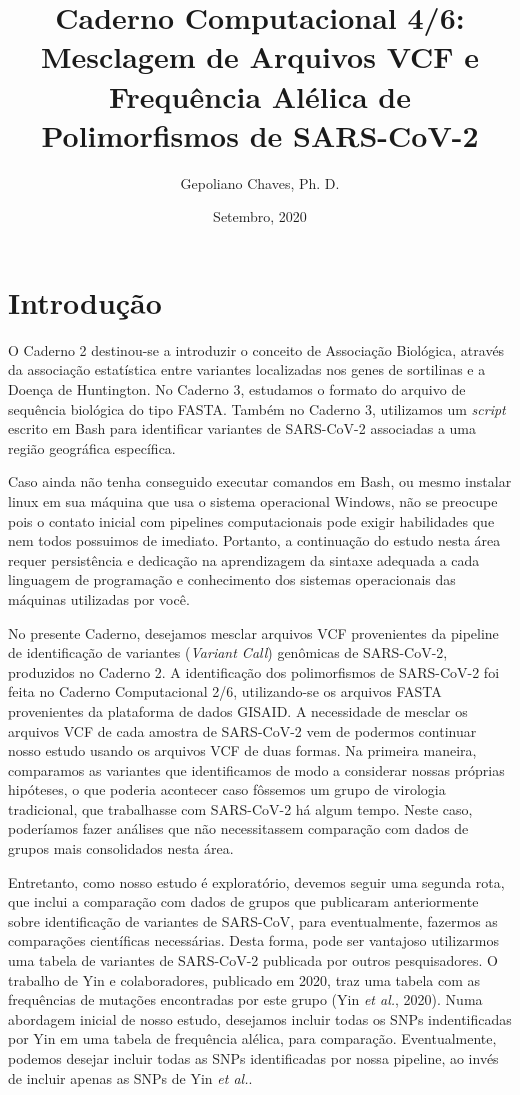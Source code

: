 \documentclass[
]{article}
\title{Caderno Computacional 4/6: Mesclagem de Arquivos VCF e Frequência
Alélica de Polimorfismos de SARS-CoV-2}
\author{Gepoliano Chaves, Ph. D.}
\date{Setembro, 2020}
\begin{document}
\maketitle

{
\setcounter{tocdepth}{5}
\tableofcontents
}
\hypertarget{introduuxe7uxe3o}{%
\section{Introdução}\label{introduuxe7uxe3o}}

O Caderno 2 destinou-se a introduzir o conceito de Associação Biológica,
através da associação estatística entre variantes localizadas nos genes
de sortilinas e a Doença de Huntington. No Caderno 3, estudamos o
formato do arquivo de sequência biológica do tipo FASTA. Também no
Caderno 3, utilizamos um \emph{script} escrito em Bash para identificar
variantes de SARS-CoV-2 associadas a uma região geográfica específica.

Caso ainda não tenha conseguido executar comandos em Bash, ou mesmo
instalar linux em sua máquina que usa o sistema operacional Windows, não
se preocupe pois o contato inicial com pipelines computacionais pode
exigir habilidades que nem todos possuimos de imediato. Portanto, a
continuação do estudo nesta área requer persistência e dedicação na
aprendizagem da sintaxe adequada a cada linguagem de programação e
conhecimento dos sistemas operacionais das máquinas utilizadas por você.

No presente Caderno, desejamos mesclar arquivos VCF provenientes da
pipeline de identificação de variantes (\emph{Variant Call}) genômicas
de SARS-CoV-2, produzidos no Caderno 2. A identificação dos
polimorfismos de SARS-CoV-2 foi feita no Caderno Computacional 2/6,
utilizando-se os arquivos FASTA provenientes da plataforma de dados
GISAID. A necessidade de mesclar os arquivos VCF de cada amostra de
SARS-CoV-2 vem de podermos continuar nosso estudo usando os arquivos VCF
de duas formas. Na primeira maneira, comparamos as variantes que
identificamos de modo a considerar nossas próprias hipóteses, o que
poderia acontecer caso fôssemos um grupo de virologia tradicional, que
trabalhasse com SARS-CoV-2 há algum tempo. Neste caso, poderíamos fazer
análises que não necessitassem comparação com dados de grupos mais
consolidados nesta área.

Entretanto, como nosso estudo é exploratório, devemos seguir uma segunda
rota, que inclui a comparação com dados de grupos que publicaram
anteriormente sobre identificação de variantes de SARS-CoV, para
eventualmente, fazermos as comparações científicas necessárias. Desta
forma, pode ser vantajoso utilizarmos uma tabela de variantes de
SARS-CoV-2 publicada por outros pesquisadores. O trabalho de Yin e
colaboradores, publicado em 2020, traz uma tabela com as frequências de
mutações encontradas por este grupo (Yin \emph{et al.}, 2020). Numa
abordagem inicial de nosso estudo, desejamos incluir todas os SNPs
indentificadas por Yin em uma tabela de frequência alélica, para
comparação. Eventualmente, podemos desejar incluir todas as SNPs
identificadas por nossa pipeline, ao invés de incluir apenas as SNPs de
Yin \emph{et al.}.
\end{document}
